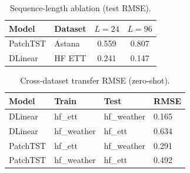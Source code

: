 \begin{table}[H]
  \centering
  \caption{Sequence-length ablation (test RMSE).}
  \label{tab:seq_ablation}
  \begin{tabular}{@{}llcc@{}}
    \toprule
    \textbf{Model} & \textbf{Dataset} & $L{=}24$ & $L{=}96$ \\
    \midrule
    PatchTST & Astana & 0.559 & 0.807 \\
    DLinear & HF ETT & 0.241 & 0.147 \\
    \bottomrule
  \end{tabular}
\end{table}

\begin{table}[H]
  \centering
  \caption{Cross-dataset transfer RMSE (zero-shot).}
  \label{tab:cross_transfer}
  \small
  \begin{tabular}{@{}llll@{}}
    \toprule
    \textbf{Model} & \textbf{Train} & \textbf{Test} & RMSE \\
    \midrule
    DLinear & hf\_ett & hf\_weather & 0.165 \\
    DLinear & hf\_weather & hf\_ett & 0.634 \\
    PatchTST & hf\_ett & hf\_weather & 0.291 \\
    PatchTST & hf\_weather & hf\_ett & 0.492 \\
    \bottomrule
  \end{tabular}
\end{table}
